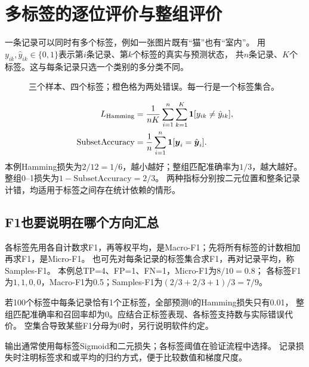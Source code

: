 \section{多标签的逐位评价与整组评价}
\label{sec:eval-multilabel}
一条记录可以同时有多个标签，例如一张图片既有“猫”也有“室内”。
用$y_{ik},\hat y_{ik}\in\{0,1\}$表示第$i$条记录、第$k$个标签的真实与预测状态，
共$n$条记录、$K$个标签。这与每条记录只选一个类别的多分类不同。

\begin{figure}[htbp]
\centering
\caption{三个样本、四个标签；橙色格为两处错误。每一行是一个标签集合。}
\par\smallskip
{}
\end{figure}

\begin{align}
 L_{\mathrm{Hamming}}&=\frac1{nK}\sum_{i=1}^n\sum_{k=1}^K
      \mathbf1[y_{ik}\ne\hat y_{ik}],\\
 \mathrm{SubsetAccuracy}&=\frac1n\sum_{i=1}^n
      \mathbf1[\boldsymbol{y}_i=\hat{\boldsymbol{y}}_i].
\end{align}
本例Hamming损失为$2/12=1/6$，越小越好；整组匹配准确率为$1/3$，越大越好。
整组0--1损失为$1-\mathrm{SubsetAccuracy}=2/3$。
两种指标分别按二元位置和整条记录计错，均适用于标签之间存在统计依赖的情形。

\subsection{F1也要说明在哪个方向汇总}
各标签先用各自计数求F1，再等权平均，是Macro-F1；先将所有标签的计数相加再求F1，是Micro-F1。
也可先对每条记录的标签集合求F1，再对记录平均，称Samples-F1。
本例总TP=4、FP=1、FN=1，Micro-F1为$8/10=0.8$；
各标签F1为$1,1,0,0$，Macro-F1为0.5；Samples-F1为$(2/3+2/3+1)/3=7/9$。

\begin{pitfall}[很多负标签会让Hamming看起来很小]
若100个标签中每条记录恰有1个正标签，全部预测0的Hamming损失只有0.01，
整组匹配准确率和召回率却为0。应结合正标签表现、各标签支持数与实际错误代价。
空集合导致某些F1分母为0时，另行说明软件约定。
\end{pitfall}

输出通常使用每标签Sigmoid和二元损失；各标签阈值在验证流程中选择。
记录损失时注明标签求和或平均的归约方式，便于比较数值和梯度尺度。
